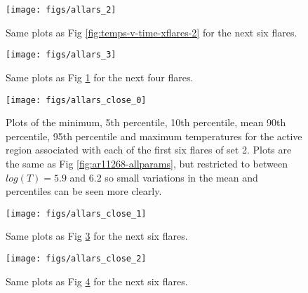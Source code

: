 \documentclass{article}
\begin{document}
\begin{figure}
\begin{centering}
\texttt{[image: figs/allars\_2]} 
\par\end{centering}

\caption{Same plots as Fig \ref{fig:temps-v-time-xflares-2} for the next six flares.
\label{fig:temps-v-time-xflares-3}}
\end{figure}

\begin{figure}
\begin{centering}
\texttt{[image: figs/allars\_3]} 
\par\end{centering}

\caption{Same plots as Fig \ref{fig:temps-v-time-xflares-3} for the next four flares.\label{fig:temps-v-time-xflares-4}}
\end{figure}

\begin{figure}
\begin{centering}
\texttt{[image: figs/allars\_close\_0]} 
\par\end{centering}

\caption{Plots of the minimum, 5th percentile, 10th percentile, mean 90th percentile, 95th percentile and maximum temperatures for the active region associated with each of the first six flares of set 2.
Plots are the same as Fig \ref{fig:ar11268-allparams}, but restricted to between $log(T)=5.9$ and $6.2$ so small variations in the mean and percentiles can be seen more clearly.\label{fig:temps-v-time-xflares-1}}
\end{figure}

\begin{figure}
\begin{centering}
\texttt{[image: figs/allars\_close\_1]} 
\par\end{centering}

\caption{Same plots as Fig \ref{fig:temps-v-time-xflares-1} for the next six flares.
\label{fig:temps-v-time-xflares-1-1}}
\end{figure}


\begin{figure}
\begin{centering}
\texttt{[image: figs/allars\_close\_2]} 
\par\end{centering}

\caption{Same plots as Fig \ref{fig:temps-v-time-xflares-1-1} for the next six flares.\label{fig:temps-v-time-xflares-1-2}}
\end{figure}
\end{document}
